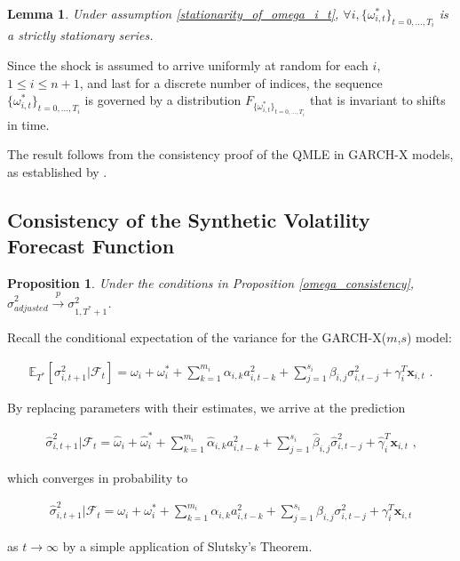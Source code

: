 \documentclass[11pt]{article}
\newcommand{\x}{\textbf{x}}
\def\E{\mathbb{E}} %
\newtheorem{lem}{Lemma}
\newtheorem{prop}{Proposition}
\theoremstyle{definition}
\newenvironment{proof-of-proposition}[1][{}]{\noindent{\bf
    Proof of Proposition {#1}}
  \hspace*{.5em}}{\qed\bigskip\\}
\newenvironment{proof-of-lemma}[1][{}]{\noindent{\bf
    Proof of Lemma {#1}}
  \hspace*{.5em}}{\qed\bigskip\\}
\begin{document}
\begin{lem}
  Under assumption \ref{stationarity_of_omega_i_t}, $\forall i, \{\omega_{i,t}^{*}\}_{t=0,...,T_i}$ is a strictly stationary series.
\end{lem}

\begin{proof-of-lemma}
Since the shock is assumed to arrive uniformly at random for each $i$, $1 \leq i \leq n + 1$, and last for a discrete number of indices, the sequence $\{\omega_{i,t}^{*}\}_{t=0,...,T_i}$ is governed by a distribution $F_{\{\omega_{i,t}^{*}\}_{t=0,...,T_i}}$ that is invariant to shifts in time.
\end{proof-of-lemma}

\begin{proof-of-proposition}
The result follows from the consistency proof of the QMLE in GARCH-X models, as established by \citet{han2014asymptotic}. 
\end{proof-of-proposition}

  \subsection{Consistency of the Synthetic Volatility Forecast Function}
\begin{prop}\label{sigma_consistency}
  Under the conditions in Proposition \ref{omega_consistency}, $\hat\sigma^{2}_{adjusted}\xrightarrow{p}\sigma^{2}_{1,T^{*}+1}$. 
\end{prop}

\begin{proof-of-proposition}
Recall the conditional expectation of the variance for the GARCH-X($m$,$s$) model:

\begin{align*}
\E_{T^{*}}[\sigma^{2}_{i,t+1}|\mathcal{F}_{t}] = \omega_{i} + \omega^{*}_i + \sum^{m_{i}}_{k=1}\alpha_{i,k}a^{2}_{i,t-k} + \sum_{j=1}^{s_{i}}\beta_{i,j}\sigma_{i,t-j}^{2} + \gamma_{i}^{T} \x_{i,t} \text{ .}
\end{align*}

By replacing parameters with their estimates, we arrive at the prediction 

\begin{align*}
\hat\sigma^{2}_{i,t+1}|\mathcal{F}_{t} = \hat\omega_{i} + \hat\omega^{*}_i + \sum^{m_{i}}_{k=1}\hat\alpha_{i,k}a^{2}_{i,t-k} + \sum_{j=1}^{s_{i}}\hat\beta_{i,j}\hat\sigma_{i,t-j}^{2} + \hat\gamma_{i}^{T} \x_{i,t} \text { ,}
\end{align*}

which converges in probability to 

\begin{align*}
  \hat\sigma^{2}_{i,t+1}|\mathcal{F}_{t} = \omega_{i} + \omega^{*}_i + \sum^{m_{i}}_{k=1}\alpha_{i,k}a^{2}_{i,t-k} + \sum_{j=1}^{s_{i}}\beta_{i,j}\sigma_{i,t-j}^{2} + \gamma_{i}^{T} \x_{i,t}
  \end{align*}

as $t\rightarrow\infty$ by a simple application of Slutsky's Theorem.

\end{proof-of-proposition}
\end{document}
